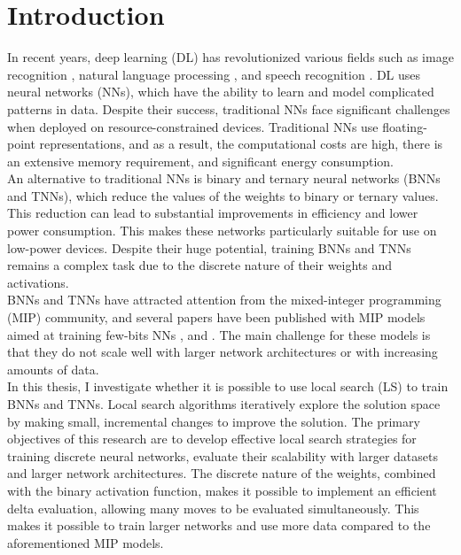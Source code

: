\section{Introduction}
In recent years, deep learning (DL) has revolutionized various fields such as image recognition \citep{imagenet2012}, natural language processing \citep{attention2017}, and speech recognition \citep{hinton2012}. DL uses neural networks (NNs), which have the ability to learn and model complicated patterns in data. Despite their success, traditional NNs face significant challenges when deployed on resource-constrained devices. Traditional NNs use floating-point representations, and as a result, the computational costs are high, there is an extensive memory requirement, and significant energy consumption. \\ 

\noindent An alternative to traditional NNs is binary and ternary neural networks (BNNs and TNNs), which reduce the values of the weights to binary or ternary values. This reduction can lead to substantial improvements in efficiency and lower power consumption. This makes these networks particularly suitable for use on low-power devices. Despite their huge potential, training BNNs and TNNs remains a complex task due to the discrete nature of their weights and activations. \\

\noindent BNNs and TNNs have attracted attention from the mixed-integer programming (MIP) community, and several papers have been published with MIP models aimed at training few-bits NNs \citep{icarte2019}, \citep{ambrogio2023} and \citep{thorbjarnason2023}. The main challenge for these models is that they do not scale well with larger network architectures or with increasing amounts of data. \\

\noindent In this thesis, I investigate whether it is possible to use local search (LS) to train BNNs and TNNs. Local search algorithms iteratively explore the solution space by making small, incremental changes to improve the solution. The primary objectives of this research are to develop effective local search strategies for training discrete neural networks, evaluate their scalability with larger datasets and larger network architectures. The discrete nature of the weights, combined with the binary activation function, makes it possible to implement an efficient delta evaluation, allowing many moves to be evaluated simultaneously. This makes it possible to train larger networks and use more data compared to the aforementioned MIP models. \\

